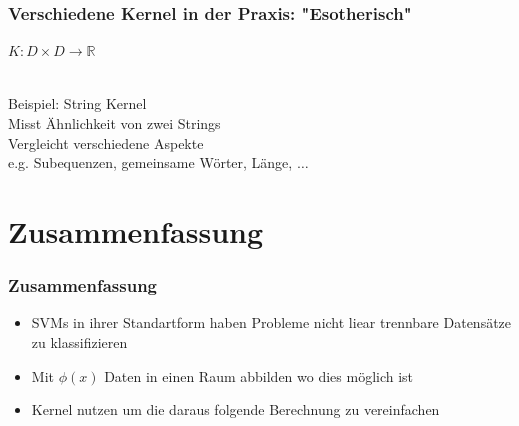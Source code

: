 	\begin{frame}
		\frametitle{Verschiedene Kernel in der Praxis: "Esotherisch"}
			$K: D \times D \rightarrow \mathbb{R}$ \\\
			
			Beispiel: String Kernel \\
			\hspace{31pt} Misst Ähnlichkeit von zwei Strings \\
			\hspace{31pt} Vergleicht verschiedene Aspekte \\
			\hspace{62pt} e.g. Subequenzen, gemeinsame Wörter, Länge, $\dots$
	\end{frame}
	
\section{Zusammenfassung}
	\begin{frame}
		\frametitle{Zusammenfassung}
			\begin{itemize}
				\item SVMs in ihrer Standartform haben Probleme nicht liear trennbare Datensätze zu klassifizieren
				\item Mit $\phi(x)$ Daten in einen Raum abbilden wo dies möglich ist
				\item Kernel nutzen um die daraus folgende Berechnung zu vereinfachen
			\end{itemize}
	\end{frame}

